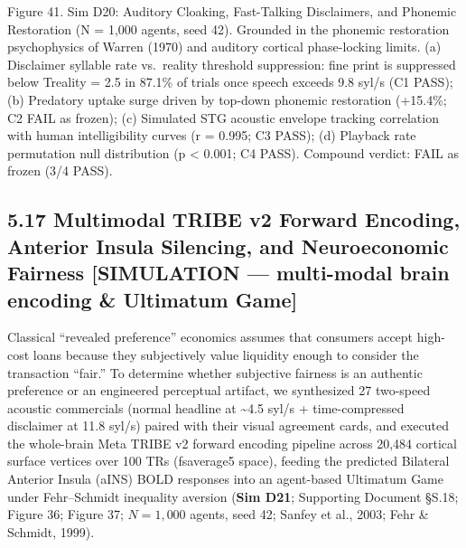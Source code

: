 \documentclass[
]{article}
\begin{document}
Figure 41. Sim D20: Auditory Cloaking, Fast-Talking Disclaimers, and
Phonemic Restoration ({N = 1,000} agents, seed 42). Grounded in the
phonemic restoration psychophysics of Warren (1970) and auditory
cortical phase-locking limits. (a) Disclaimer syllable rate vs.~reality
threshold suppression: fine print is suppressed below {Treality = 2.5}
in 87.1\% of trials once speech exceeds 9.8 syl/s (C1 PASS); (b)
Predatory uptake surge driven by top-down phonemic restoration (+15.4\%;
C2 FAIL as frozen); (c) Simulated STG acoustic envelope tracking
correlation with human intelligibility curves ({r = 0.995}; C3 PASS);
(d) Playback rate permutation null distribution ({p \textless{} 0.001};
C4 PASS). Compound verdict: FAIL as frozen (3/4 PASS).

\subsection{5.17 Multimodal TRIBE v2 Forward Encoding, Anterior Insula
Silencing, and Neuroeconomic Fairness {[}SIMULATION --- multi-modal
brain encoding \& Ultimatum
Game{]}}\label{multimodal-tribe-v2-forward-encoding-anterior-insula-silencing-and-neuroeconomic-fairness-simulation-multi-modal-brain-encoding-ultimatum-game}

Classical ``revealed preference'' economics assumes that consumers
accept high-cost loans because they subjectively value liquidity enough
to consider the transaction ``fair.'' To determine whether subjective
fairness is an authentic preference or an engineered perceptual
artifact, we synthesized 27 two-speed acoustic commercials (normal
headline at \textasciitilde4.5 syl/s + time-compressed disclaimer at
11.8 syl/s) paired with their visual agreement cards, and executed the
whole-brain Meta TRIBE v2 forward encoding pipeline across 20,484
cortical surface vertices over 100 TRs (fsaverage5 space), feeding the
predicted Bilateral Anterior Insula (aINS) BOLD responses into an
agent-based Ultimatum Game under Fehr--Schmidt inequality aversion
(\textbf{Sim D21}; Supporting Document §S.18; Figure 36; Figure 37;
\(N = 1,000\) agents, seed 42; Sanfey et al., 2003; Fehr \& Schmidt,
1999).
\end{document}

